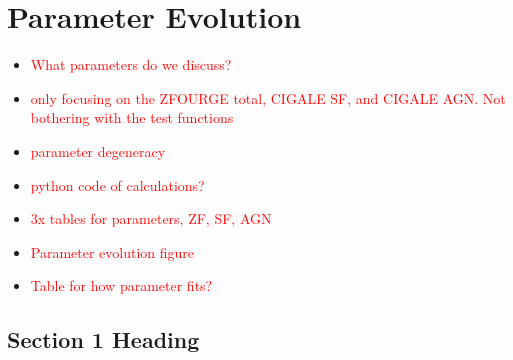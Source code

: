 \chapter{Parameter Evolution}
\thispagestyle{empty}

\begin{itemize}
    \item \textcolor{red}{What parameters do we discuss?}
    \item \textcolor{red}{only focusing on the ZFOURGE total, CIGALE SF, and CIGALE AGN. Not bothering with the test functions}
    \item \textcolor{red}{parameter degeneracy}
    \item \textcolor{red}{python code of calculations?}
    \item \textcolor{red}{3x tables for parameters, ZF, SF, AGN}
    \item \textcolor{red}{Parameter evolution figure}
    \item \textcolor{red}{Table for how parameter fits?}
\end{itemize}

\section{Section 1 Heading}
\lipsum[1]